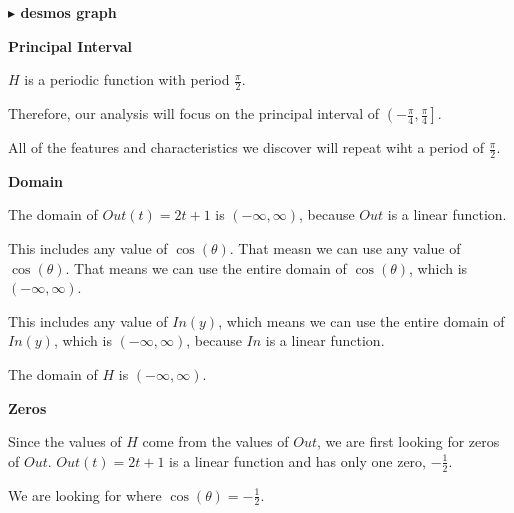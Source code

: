 \documentclass{ximera}
\begin{document}
\textbf{\textcolor{blue!55!black}{$\blacktriangleright$ desmos graph}} 
\begin{center}
\end{center}












\begin{observation} \textbf{\textcolor{-red!75}{Principal Interval}}

$H$ is a periodic function with period $\frac{\pi}{2}$. 


Therefore, our analysis will focus on the principal interval of $\left( -\frac{\pi}{4}, \frac{\pi}{4} \right]$. 


All of the features and characteristics we discover will repeat wiht a period of $\frac{\pi}{2}$.


\end{observation}














\textbf{\textcolor{blue!55!black}{Domain}}


The domain of $Out(t) = 2t + 1$ is $(-\infty, \infty)$, because $Out$ is a linear function.  

This includes any value of $\cos(\theta)$. That measn we can use any value of $\cos(\theta)$. That means we can use the entire domain of $\cos(\theta)$, which is $(-\infty, \infty)$.  


This includes any value of $In(y)$, which means we can use the entire domain of $In(y)$, which is $(-\infty, \infty)$, because $In$ is a linear function.  


The domain of $H$ is $(-\infty, \infty)$. 











\textbf{\textcolor{blue!55!black}{Zeros}}


Since the values of $H$ come from the values of $Out$, we are first looking for zeros of $Out$.  $Out(t) = 2t + 1$ is a linear function and has only one zero, $-\frac{1}{2}$. 

We are looking for where $\cos(\theta) = -\frac{1}{2}$. 
\end{document}
